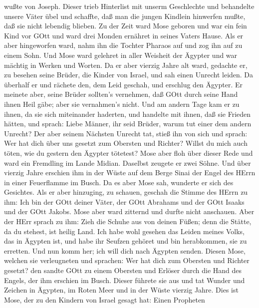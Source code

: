 wußte von Joseph.  Dieser trieb Hinterlist mit unserm
Geschlechte und behandelte unsere Väter übel und schaffte, daß man die
jungen Kindlein hinwerfen mußte, daß sie nicht lebendig blieben.
 Zu der Zeit ward Mose geboren und war ein fein Kind vor
GOtt und ward drei Monden ernähret in seines Vaters Hause. 
Als er aber hingeworfen ward, nahm ihn die Tochter Pharaos auf und zog
ihn auf zu einem Sohn.  Und Mose ward gelehret in aller
Weisheit der Ägypter und war mächtig in Werken und Worten. 
Da er aber vierzig Jahre alt ward, gedachte er, zu besehen seine Brüder,
die Kinder von Israel,  und sah einen Unrecht leiden. Da
überhalf er und rächete den, dem Leid geschah, und erschlug den Ägypter.
 Er meinete aber, seine Brüder sollten's vernehmen, daß
GOtt durch seine Hand ihnen Heil gäbe; aber sie vernahmen's nicht.
 Und am andern Tage kam er zu ihnen, da sie sich
miteinander haderten, und handelte mit ihnen, daß sie Frieden hätten,
und sprach: Liebe Männer, ihr seid Brüder, warum tut einer dem andern
Unrecht?  Der aber seinem Nächsten Unrecht tat, stieß ihn
von sich und sprach: Wer hat dich über uns gesetzt zum Obersten und
Richter?  Willst du mich auch töten, wie du gestern den
Ägypter tötetest?  Mose aber floh über dieser Rede und ward
ein Fremdling im Lande Midian. Daselbst zeugete er zwei Söhne.
 Und über vierzig Jahre erschien ihm in der Wüste auf dem
Berge Sinai der Engel des HErrn in einer Feuerflamme im Busch.
 Da es aber Mose sah, wunderte er sich des Gesichtes. Als
er aber hinzuging, zu schauen, geschah die Stimme des HErrn zu ihm:
 Ich bin der GOtt deiner Väter, der GOtt Abrahams und der
GOtt Isaaks und der GOtt Jakobs. Mose aber ward zitternd und durfte
nicht anschauen.  Aber der HErr sprach zu ihm: Zieh die
Schuhe aus von deinen Füßen; denn die Stätte, da du stehest, ist heilig
Land.  Ich habe wohl gesehen das Leiden meines Volks, das
in Ägypten ist, und habe ihr Seufzen gehöret und bin herabkommen, sie zu
erretten. Und nun komm her; ich will dich nach Ägypten senden.
 Diesen Mose, welchen sie verleugneten und sprachen: Wer
hat dich zum Obersten und Richter gesetzt? den sandte GOtt zu einem
Obersten und Erlöser durch die Hand des Engels, der ihm erschien im
Busch.  Dieser führete sie aus und tat Wunder und Zeichen
in Ägypten, im Roten Meer und in der Wüste vierzig Jahre. 
Dies ist Mose, der zu den Kindern von Israel gesagt hat: Einen Propheten
